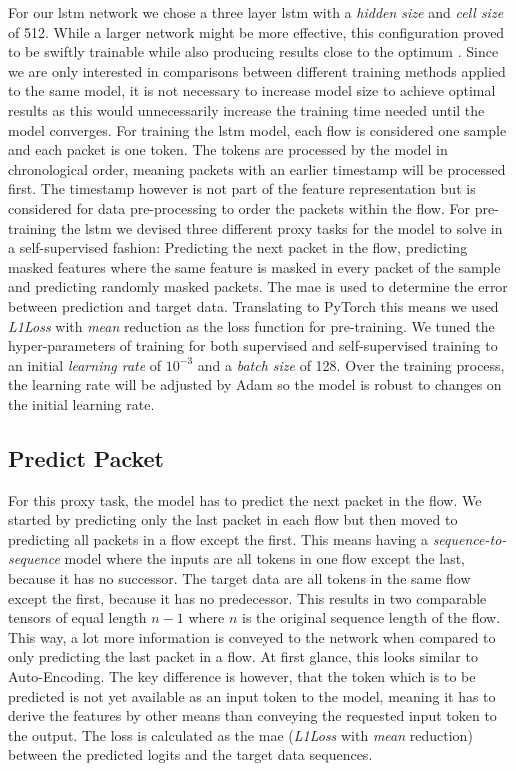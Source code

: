 For our \gls{lstm} network we chose a three layer \gls{lstm} with a \textit{hidden size} and \textit{cell size} of 512. While a larger network might be more effective, this configuration proved to be swiftly trainable while also producing results close to the optimum . Since we are only interested in comparisons between different training methods applied to the same model, it is not necessary to increase model size to achieve optimal results as this would unnecessarily increase the training time needed until the model converges. For training the \gls{lstm} model, each flow is considered one sample and each packet is one token. The tokens are processed by the model in chronological order, meaning packets with an earlier timestamp will be processed first. The timestamp however is not part of the feature representation but is considered for data pre-processing to order the packets within the flow. For pre-training the \gls{lstm} we devised three different proxy tasks for the model to solve in a self-supervised fashion: Predicting the next packet in the flow, predicting masked features where the same feature is masked in every packet of the sample and predicting randomly masked packets. The \gls{mae} is used to determine the error between prediction and target data. Translating to PyTorch this means we used \textit{L1Loss} with \textit{mean} reduction as the loss function for pre-training. We tuned the hyper-parameters of training for both supervised and self-supervised training to an initial \textit{learning rate} of $10^{-3}$ and a \textit{batch size} of 128. Over the training process, the learning rate will be adjusted by Adam so the model is robust to changes on the initial learning rate. 

\subsection{Predict Packet} \label{sec:experiments_lstm_predict_packet}

For this proxy task, the model has to predict the next packet in the flow. We started by predicting only the last packet in each flow but then moved to predicting all packets in a flow except the first. This means having a \textit{sequence-to-sequence} model where the inputs are all tokens in one flow except the last, because it has no successor. The target data are all tokens in the same flow except the first, because it has no predecessor. This results in two comparable tensors of equal length $n-1$ where $n$ is the original sequence length of the flow. This way, a lot more information is conveyed to the network when compared to only predicting the last packet in a flow. At first glance, this looks similar to Auto-Encoding. The key difference is however, that the token which is to be predicted is not yet available as an input token to the model, meaning it has to derive the features by other means than conveying the requested input token to the output. The loss is calculated as the \gls{mae} (\textit{L1Loss} with \textit{mean} reduction) between the predicted logits and the target data sequences.

